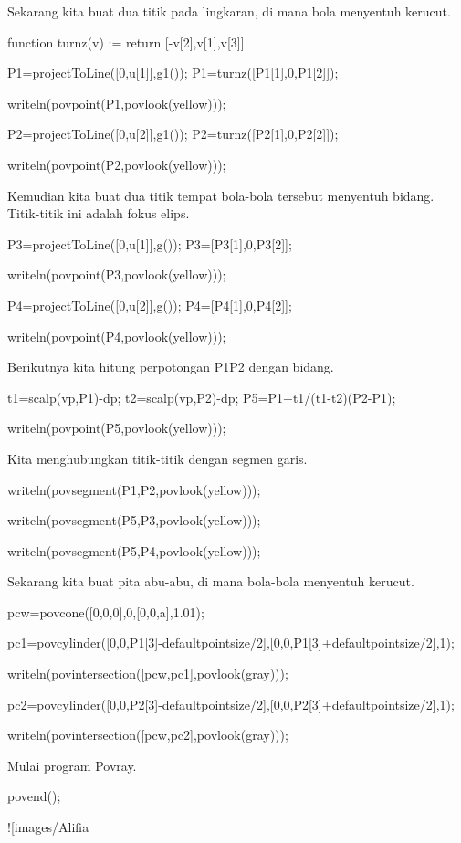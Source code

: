 \documentclass{article}
\begin{document}
Sekarang kita buat dua titik pada lingkaran, di mana bola menyentuh
kerucut.


\>function turnz(v) := return [-v[2],v[1],v[3]]

\>P1=projectToLine([0,u[1]],g1()); P1=turnz([P1[1],0,P1[2]]);

\>writeln(povpoint(P1,povlook(yellow)));

\>P2=projectToLine([0,u[2]],g1()); P2=turnz([P2[1],0,P2[2]]);

\>writeln(povpoint(P2,povlook(yellow)));


Kemudian kita buat dua titik tempat bola-bola tersebut menyentuh
bidang. Titik-titik ini adalah fokus elips.


\>P3=projectToLine([0,u[1]],g()); P3=[P3[1],0,P3[2]];

\>writeln(povpoint(P3,povlook(yellow)));

\>P4=projectToLine([0,u[2]],g()); P4=[P4[1],0,P4[2]];

\>writeln(povpoint(P4,povlook(yellow)));


Berikutnya kita hitung perpotongan P1P2 dengan bidang.


\>t1=scalp(vp,P1)-dp; t2=scalp(vp,P2)-dp; P5=P1+t1/(t1-t2)\*(P2-P1);

\>writeln(povpoint(P5,povlook(yellow)));


Kita menghubungkan titik-titik dengan segmen garis.


\>writeln(povsegment(P1,P2,povlook(yellow)));

\>writeln(povsegment(P5,P3,povlook(yellow)));

\>writeln(povsegment(P5,P4,povlook(yellow)));


Sekarang kita buat pita abu-abu, di mana bola-bola menyentuh kerucut.


\>pcw=povcone([0,0,0],0,[0,0,a],1.01);

\>pc1=povcylinder([0,0,P1[3]-defaultpointsize/2],[0,0,P1[3]+defaultpointsize/2],1);

\>writeln(povintersection([pcw,pc1],povlook(gray)));

\>pc2=povcylinder([0,0,P2[3]-defaultpointsize/2],[0,0,P2[3]+defaultpointsize/2],1);

\>writeln(povintersection([pcw,pc2],povlook(gray)));


Mulai program Povray.


\>povend();


![images/Alifia%
\end{document}
